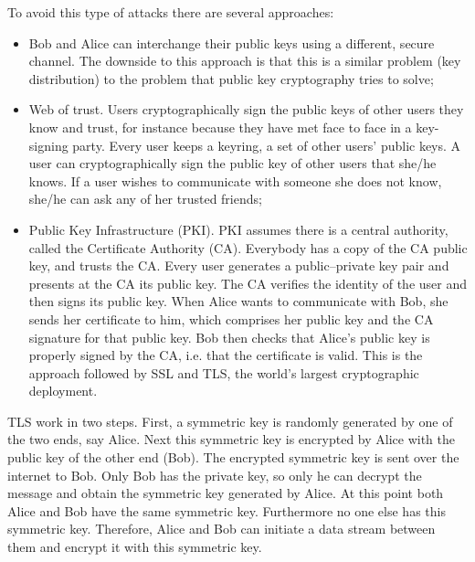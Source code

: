 \documentclass{article}
\begin{document}
\noindent To avoid this type of attacks there are several approaches:
\begin{itemize}
    \item Bob and Alice can interchange their public keys using a different, secure channel. The downside to this approach is that this is a similar problem (key distribution) to the problem that public key cryptography tries to solve;
    \item Web of trust. Users cryptographically sign the public keys of other users they know and trust, for instance because they have met face to face in a key-signing party. Every user keeps a keyring, a set of other users’ public keys. A user can cryptographically sign the public key of other users that she/he knows. If a user wishes to communicate with someone she does not know, she/he can ask any of her trusted friends;
    \item Public Key Infrastructure (PKI). PKI assumes there is a central authority, called the Certificate Authority (CA). Everybody has a copy of the CA public key, and trusts the CA. Every user generates a public–private key pair and presents at the CA its public key. The CA verifies the identity of the user and then signs its public key. When Alice wants to communicate with Bob, she sends her certificate to him, which comprises her public key and the CA signature for that public key. Bob then checks that Alice’s public key is properly signed by the CA, i.e. that the certificate is valid. This is the approach followed by SSL and TLS, the world’s largest cryptographic deployment.
\end{itemize}
TLS work in two steps. First, a symmetric key is randomly generated by one of the two ends, say Alice. Next this symmetric key is encrypted by Alice with the public key of the other end (Bob). The encrypted symmetric key is sent over the internet to Bob. Only Bob has the private key, so only he can decrypt the message and obtain the symmetric key generated by Alice. At this point both Alice and Bob have the same symmetric key. Furthermore no one else has this symmetric key. Therefore, Alice and Bob can initiate a data stream between them and encrypt it with this symmetric key.
\end{document}
